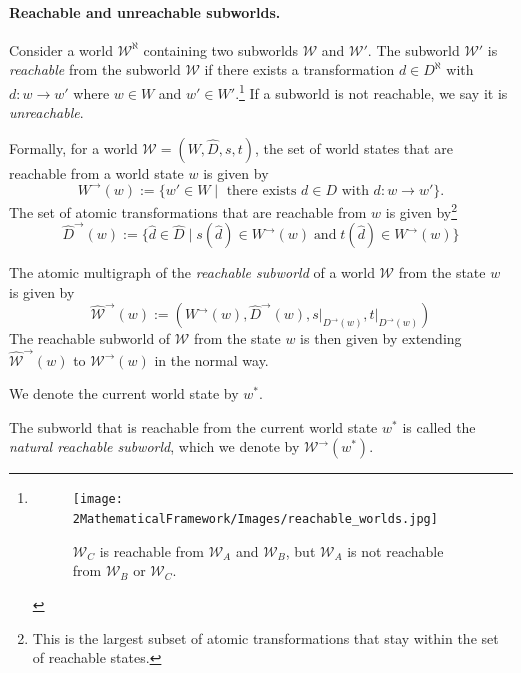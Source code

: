 \paragraph{Reachable and unreachable subworlds.}
Consider a world $\mathscr{W}^{\aleph}$ containing two subworlds $\mathscr{W}$ and $\mathscr{W}'$.
The subworld $\mathscr{W}'$ is \emph{reachable} from the subworld $\mathscr{W}$ if there exists a transformation $d \in D^{\aleph}$ with $d: w \to w'$ where $w \in W$ and $w' \in W'$.\footnote{
\begin{figure}[H]
	\centering
	\texttt{[image: 2MathematicalFramework/Images/reachable\_worlds.jpg]}
	\caption{
		$\mathscr{W}_{C}$ is reachable from $\mathscr{W}_{A}$ and $\mathscr{W}_{B}$, but $\mathscr{W}_{A}$ is not reachable from $\mathscr{W}_{B}$ or $\mathscr{W}_{C}$.
	}
	\label{fig:reachable_worlds}
\end{figure}
}
If a subworld is not reachable, we say it is \emph{unreachable}.

Formally, for a world $\mathscr{W} = (W, \hat{D}, s, t)$, the set of world states that are reachable from a world state $w$ is given by
\begin{equation}
	W^{\to}(w) := \{ w' \in W \mid \text{ there exists } d \in D \text{ with } d: w \to w' \}.
\end{equation}
The set of atomic transformations that are reachable from $w$ is given by\footnote{
	This is the largest subset of atomic transformations that stay within the set of reachable states.
}
\begin{equation}
	\hat{D}^{\to}(w) := \{ \hat{d} \in \hat{D} \mid s(\hat{d}) \in W^{\to}(w) \; \text{and} \; t(\hat{d}) \in W^{\to}(w) \}
\end{equation}

The atomic multigraph of the \emph{reachable subworld} of a world $\mathscr{W}$ from the state $w$ is given by
\begin{equation}
	\hat{\mathscr{W}}^{\to}(w) := (W^{\to}(w), \hat{D}^{\to}(w), s \big|_{D^{\to}(w)}, t \big|_{D^{\to}(w)})
\end{equation}
The reachable subworld of $\mathscr{W}$ from the state $w$ is then given by extending $\hat{\mathscr{W}}^{\to}(w)$ to $\mathscr{W}^{\to}(w)$ in the normal way.

\begin{definition}
	We denote the current world state by $w^{*}$.
\end{definition}

The subworld that is reachable from the current world state $w^{*}$ is called the \emph{natural reachable subworld}, which we denote by $\mathscr{W}^{\to}(w^{*})$.




